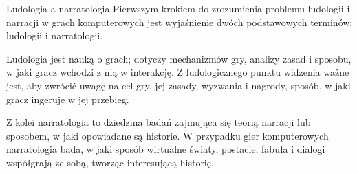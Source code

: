 \begin{frame}{Ludologia a narratologia}
Pierwszym krokiem do zrozumienia problemu ludologii i narracji w grach komputerowych jest wyjaśnienie dwóch podstawowych terminów: ludologii i narratologii.

Ludologia jest nauką o grach; dotyczy mechanizmów gry, analizy zasad i sposobu, w jaki gracz wchodzi z nią w interakcję. Z ludologicznego punktu widzenia ważne jest, aby zwrócić uwagę na cel gry, jej zasady, wyzwania i nagrody, sposób, w jaki gracz ingeruje w jej przebieg.

Z kolei narratologia to dziedzina badań zajmująca się teorią narracji lub sposobem, w jaki opowiadane są historie. W przypadku gier komputerowych narratologia bada, w jaki sposób wirtualne światy, postacie, fabuła i dialogi współgrają ze sobą, tworząc interesującą historię.

\end{frame}
